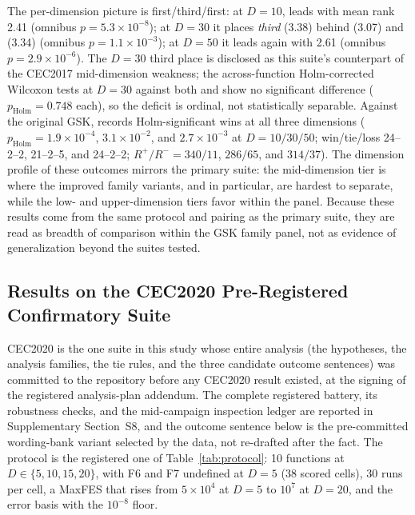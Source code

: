 The per-dimension picture is first/third/first: at $D = 10$,
\dtgsk{} leads with mean rank 2.41 (omnibus
$p = 5.3 \times 10^{-8}$); at $D = 30$ it places \emph{third} (3.38)
behind \egsk{} (3.07) and \atmals{} (3.34) (omnibus
$p = 1.1 \times 10^{-3}$); at $D = 50$ it leads again with 2.61
(omnibus $p = 2.9 \times 10^{-6}$).
The $D = 30$ third place is disclosed as this suite's counterpart of
the CEC2017 mid-dimension weakness; the across-function
Holm-corrected Wilcoxon tests at $D = 30$ against both \egsk{} and
\atmals{} show no significant difference ($p_{\mathrm{Holm}} = 0.748$
each), so the deficit is ordinal, not statistically separable.
Against the original GSK, \dtgsk{} records Holm-significant wins at
all three dimensions
($p_{\mathrm{Holm}} = 1.9 \times 10^{-4}$, $3.1 \times 10^{-2}$, and
$2.7 \times 10^{-3}$ at $D = 10/30/50$; win/tie/loss 24--2--2,
21--2--5, and 24--2--2; $R^{+}/R^{-} = 340/11$, $286/65$, and
$314/37$).
The dimension profile of these outcomes mirrors the primary suite:
the mid-dimension tier is where the improved family variants,
\egsk{} and \atmals{} in particular, are hardest to separate,
while the low- and upper-dimension tiers favor \dtgsk{} within the
panel.
Because these results come from the same protocol and pairing as the
primary suite, they are read as breadth of comparison within the GSK
family panel, not as evidence of generalization beyond the suites
tested.

\subsection{Results on the CEC2020 Pre-Registered Confirmatory Suite}\label{sec:exp:cec2020}

CEC2020 is the one suite in this study whose entire analysis (the
hypotheses, the analysis families, the tie rules, and the three candidate
outcome sentences) was committed to the repository before any CEC2020
result existed, at the signing of the registered
analysis-plan addendum. The complete registered battery, its robustness
checks, and the mid-campaign inspection ledger are reported in
Supplementary Section~S8, and the outcome sentence below is the
pre-committed wording-bank variant selected by the data, not re-drafted
after the fact.
The protocol is the registered one of Table~\ref{tab:protocol}: 10
functions at $D \in \{5, 10, 15, 20\}$, with F6 and F7 undefined at
$D = 5$ (38 scored cells), 30 runs per cell, a MaxFES that rises from
$5 \times 10^{4}$ at $D = 5$ to $10^{7}$ at $D = 20$, and the error
basis with the $10^{-8}$ floor.

